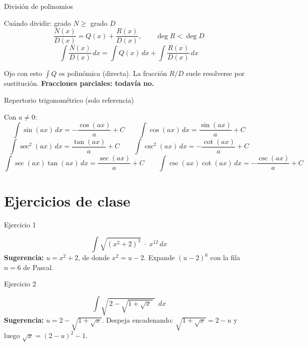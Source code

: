 \documentclass[aspectratio=169]{beamer}
\newcommand{\dx}{\,dx}
\begin{document}
\begin{frame}{División de polinomios}
  \begin{block}{Cuándo dividir: grado $N \geq$ grado $D$}
    \[
      \frac{N(x)}{D(x)} = Q(x) + \frac{R(x)}{D(x)},
      \qquad \deg R < \deg D
    \]
    \[
      \int \frac{N(x)}{D(x)}\dx = \int Q(x)\dx + \int \frac{R(x)}{D(x)}\dx
    \]
  \end{block}
  \vspace{2pt}
  \begin{alertblock}{Ojo con esto}
    $\int Q$ es polinómica (directa). La fracción $R/D$ suele resolverse por
    sustitución. \textbf{Fracciones parciales: todavía no.}
  \end{alertblock}
\end{frame}

\begin{frame}{Repertorio trigonométrico (solo referencia)}
  \begin{mwextra}
    Con $a\neq 0$:
    \[
      \int\sin(ax)\dx=-\frac{\cos(ax)}{a}+C
      \qquad
      \int\cos(ax)\dx=\frac{\sin(ax)}{a}+C
    \]
    \[
      \int\sec^{2}(ax)\dx=\frac{\tan(ax)}{a}+C
      \qquad
      \int\csc^{2}(ax)\dx=-\frac{\cot(ax)}{a}+C
    \]
    \[
      \int\sec(ax)\tan(ax)\dx=\frac{\sec(ax)}{a}+C
      \qquad
      \int\csc(ax)\cot(ax)\dx=-\frac{\csc(ax)}{a}+C
    \]
  \end{mwextra}
\end{frame}

\section{Ejercicios de clase}

\begin{frame}{Ejercicio 1}
  \begin{mwejercicio}
    \[
      \int \sqrt{(x^{2}+2)^{3}}\;\cdot\;x^{12}\dx
    \]
    \small
    \textbf{Sugerencia:} $u = x^{2}+2$, de donde $x^{2} = u-2$.
    Expande $(u-2)^{6}$ con la fila $n=6$ de Pascal.
  \end{mwejercicio}
\end{frame}

\begin{frame}{Ejercicio 2}
  \begin{mwejercicio}
    \[
      \int \sqrt{\,2-\sqrt{1+\sqrt{x}\,}\;}\;\dx
    \]
    \small
    \textbf{Sugerencia:} $u = 2-\sqrt{1+\sqrt{x}}$. Despeja encadenando:
    $\sqrt{1+\sqrt{x}} = 2-u$ y luego $\sqrt{x} = (2-u)^{2}-1$.
  \end{mwejercicio}
\end{frame}
\end{document}
